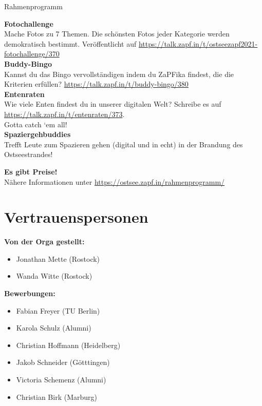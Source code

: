 \documentclass[compress, aspectratio=169]{beamer}
\begin{document}
\begin{frame}{Rahmenprogramm}
    \begin{footnotesize}
    \textbf{Fotochallenge}\\
    Mache Fotos zu 7 Themen. Die schönsten Fotos jeder Kategorie werden demokratisch bestimmt.
    Veröffentlicht auf \url{https://talk.zapf.in/t/ostseezapf2021-fotochallenge/370}\\
    \textbf{Buddy-Bingo}\\ 
    Kannst du das Bingo vervollständigen indem du ZaPFika findest, die die Kriterien erfüllen? \url{https://talk.zapf.in/t/buddy-bingo/380}\\
    \textbf{Entenraten}\\
    Wie viele Enten findest du in unserer digitalen Welt?
    Schreibe es auf \url{https://talk.zapf.in/t/entenraten/373}.\\
    Gotta catch ‘em all!\\
    \textbf{Spaziergehbuddies}\\
    Trefft Leute zum Spazieren gehen (digital und in echt) in der Brandung des Ostseestrandes!\\
    \begin{center}
        \textbf{Es gibt Preise!}\\
        Nähere Informationen unter \url{https://ostsee.zapf.in/rahmenprogramm/}
    \end{center}
    \end{footnotesize}
    
\end{frame}

\section{Vertrauenspersonen}
\begin{frame}{\insertsection}
	\centering
	\begin{minipage}[t]{.45\linewidth}
		\textbf{Von der Orga gestellt:}
		\begin{itemize}
			\item Jonathan Mette (Rostock)
			\item Wanda Witte (Rostock)
		\end{itemize}
	\end{minipage}
	\begin{minipage}[t]{.45\linewidth}
		\textbf{Bewerbungen:}
		\begin{itemize}
			\item Fabian Freyer (TU Berlin)
			\item Karola Schulz (Alumni)
			\item Christian Hoffmann  (Heidelberg)
			\item Jakob Schneider (Götttingen)
			\item Victoria Schemenz (Alumni)
			\item Christian Birk (Marburg)
		\end{itemize}
	\end{minipage}
\end{frame}
	
\end{document}
